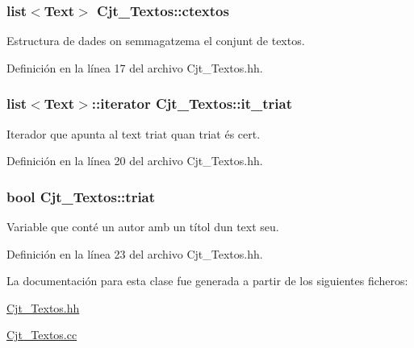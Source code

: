 \subsubsection[{\texorpdfstring{ctextos}{ctextos}}]{\setlength{\rightskip}{0pt plus 5cm}list$<${\bf Text}$>$ Cjt\+\_\+\+Textos\+::ctextos\hspace{0.3cm}{\ttfamily [private]}}\hypertarget{class_cjt___textos_a73503568d56e3a77949f720684916492}{}\label{class_cjt___textos_a73503568d56e3a77949f720684916492}


Estructura de dades on s\textquotesingle{}emmagatzema el conjunt de textos. 



Definición en la línea 17 del archivo Cjt\+\_\+\+Textos.\+hh.

\subsubsection[{\texorpdfstring{it\+\_\+triat}{it_triat}}]{\setlength{\rightskip}{0pt plus 5cm}list$<${\bf Text}$>$\+::iterator Cjt\+\_\+\+Textos\+::it\+\_\+triat\hspace{0.3cm}{\ttfamily [private]}}\hypertarget{class_cjt___textos_ab4e8c0ec60d6cd3d71c348926ed4d46a}{}\label{class_cjt___textos_ab4e8c0ec60d6cd3d71c348926ed4d46a}


Iterador que apunta al text triat quan triat és cert. 



Definición en la línea 20 del archivo Cjt\+\_\+\+Textos.\+hh.

\subsubsection[{\texorpdfstring{triat}{triat}}]{\setlength{\rightskip}{0pt plus 5cm}bool Cjt\+\_\+\+Textos\+::triat\hspace{0.3cm}{\ttfamily [private]}}\hypertarget{class_cjt___textos_abc00e6c9c3b2d4ebfcfc4ad15e2646ed}{}\label{class_cjt___textos_abc00e6c9c3b2d4ebfcfc4ad15e2646ed}


Variable que conté un autor amb un títol d\textquotesingle{}un text seu. 



Definición en la línea 23 del archivo Cjt\+\_\+\+Textos.\+hh.



La documentación para esta clase fue generada a partir de los siguientes ficheros\+:\begin{DoxyCompactItemize}
\item 
\hyperlink{_cjt___textos_8hh}{Cjt\+\_\+\+Textos.\+hh}\item 
\hyperlink{_cjt___textos_8cc}{Cjt\+\_\+\+Textos.\+cc}\end{DoxyCompactItemize}
